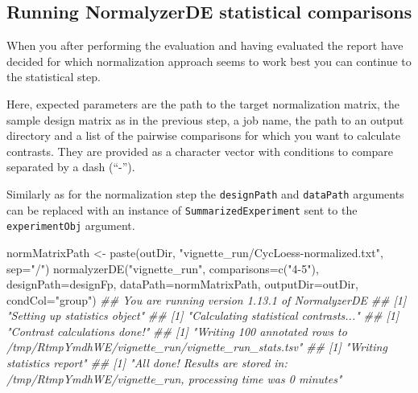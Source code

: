 \documentclass[]{article}
\newcommand{\hlstr}[1]{\textcolor[rgb]{0.251,0.627,0.251}{#1}}%
\newcommand{\hlcom}[1]{\textcolor[rgb]{0.502,0.502,0.502}{\textit{#1}}}%
\newcommand{\hlstd}[1]{\textcolor[rgb]{0.251,0.251,0.251}{#1}}%
\newenvironment{Shaded}{\begin{myshaded}}{\end{myshaded}}
\newcommand{\StringTok}[1]{\hlstr{#1}}
\newcommand{\DocumentationTok}[1]{\hlcom{#1}}
\newcommand{\OtherTok}[1]{{#1}}
\newcommand{\FunctionTok}[1]{\hlstd{#1}}
\newcommand{\AttributeTok}[1]{{#1}}
\newcommand{\NormalTok}[1]{\hlstd{#1}}
\begin{document}
\hypertarget{running-normalyzerde-statistical-comparisons}{%
\subsection{Running NormalyzerDE statistical comparisons}\label{running-normalyzerde-statistical-comparisons}}

When you after performing the evaluation and having evaluated the report have decided
for which normalization approach seems to work best you can continue to the statistical step.

Here, expected parameters are the path to the target normalization matrix, the sample design matrix as
in the previous step, a job name, the path to an output directory and a list of the pairwise comparisons
for which you want to calculate contrasts. They are provided as a character vector with conditions to
compare separated by a dash (``-'').

Similarly as for the normalization step the \texttt{designPath} and \texttt{dataPath} arguments can be replaced with
an instance of \texttt{SummarizedExperiment} sent to the \texttt{experimentObj} argument.

\begin{Shaded}
\begin{Highlighting}[]
\NormalTok{normMatrixPath }\OtherTok{\textless{}{-}} \FunctionTok{paste}\NormalTok{(outDir, }\StringTok{"vignette\_run/CycLoess{-}normalized.txt"}\NormalTok{, }\AttributeTok{sep=}\StringTok{"/"}\NormalTok{)}
\FunctionTok{normalyzerDE}\NormalTok{(}\StringTok{"vignette\_run"}\NormalTok{, }
             \AttributeTok{comparisons=}\FunctionTok{c}\NormalTok{(}\StringTok{"4{-}5"}\NormalTok{),}
             \AttributeTok{designPath=}\NormalTok{designFp, }
             \AttributeTok{dataPath=}\NormalTok{normMatrixPath,}
             \AttributeTok{outputDir=}\NormalTok{outDir, }
             \AttributeTok{condCol=}\StringTok{"group"}\NormalTok{)}
\DocumentationTok{\#\# You are running version 1.13.1 of NormalyzerDE}
\DocumentationTok{\#\# [1] "Setting up statistics object"}
\DocumentationTok{\#\# [1] "Calculating statistical contrasts..."}
\DocumentationTok{\#\# [1] "Contrast calculations done!"}
\DocumentationTok{\#\# [1] "Writing 100 annotated rows to /tmp/RtmpYmdhWE/vignette\_run/vignette\_run\_stats.tsv"}
\DocumentationTok{\#\# [1] "Writing statistics report"}
\DocumentationTok{\#\# [1] "All done! Results are stored in: /tmp/RtmpYmdhWE/vignette\_run, processing time was 0 minutes"}
\end{Highlighting}
\end{Shaded}
\end{document}
